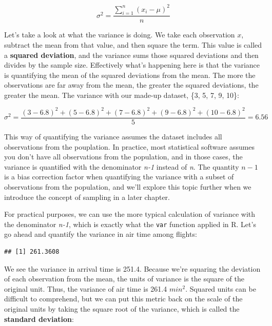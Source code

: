 \documentclass[
]{book}
\newenvironment{Shaded}{\begin{snugshade}}{\end{snugshade}}
\newcommand{\AttributeTok}[1]{\textcolor[rgb]{0.13,0.29,0.53}{#1}}
\newcommand{\FunctionTok}[1]{\textcolor[rgb]{0.13,0.29,0.53}{\textbf{#1}}}
\newcommand{\NormalTok}[1]{#1}
\newcommand{\SpecialCharTok}[1]{\textcolor[rgb]{0.81,0.36,0.00}{\textbf{#1}}}
\begin{document}
\[
{\sigma}^2 = \frac{\sum_{i=1}^n (x_i - \mu)^2}{n}
\]

Let's take a look at what the variance is doing. We take each observation \(x\), subtract the mean from that value, and then square the term. This value is called a \textbf{squared deviation}, and the variance sums those squared deviations and then divides by the sample size. Effectively what's happening here is that the variance is quantifying the mean of the squared deviations from the mean. The more the observations are far away from the mean, the greater the squared deviations, the greater the mean. The variance with our made-up dataset, \{3, 5, 7, 9, 10\}:

\[
\sigma^2 = \frac{(3 - 6.8)^2 + (5 - 6.8)^2 + (7 - 6.8)^2 + (9 - 6.8)^2 + (10 - 6.8)^2}{5} = 6.56
\]

This way of quantifying the variance assumes the dataset includes all observations from the pouplation. In practice, most statistical software assumes you don't have all observations from the population, and in those cases, the variance is quantified with the denominator \emph{n-1} instead of \emph{n}. The quantity \(n-1\) is a bias correction factor when quantifying the variance with a subset of observations from the population, and we'll explore this topic further when we introduce the concept of sampling in a later chapter.

For practical purposes, we can use the more typical calculation of variance with the denominator \emph{n-1}, which is exactly what the \texttt{var} function applied in R. Let's go ahead and quantify the variance in air time among flights:

\begin{Shaded}
\end{Shaded}

\begin{verbatim}
## [1] 261.3608
\end{verbatim}

We see the variance in arrival time is 251.4. Because we're squaring the deviation of each observation from the mean, the units of variance is the square of the original unit. Thus, the variance of air time is 261.4 \(min^2\). Squared units can be difficult to comprehend, but we can put this metric back on the scale of the original units by taking the square root of the variance, which is called the \textbf{standard deviation}:
\end{document}
